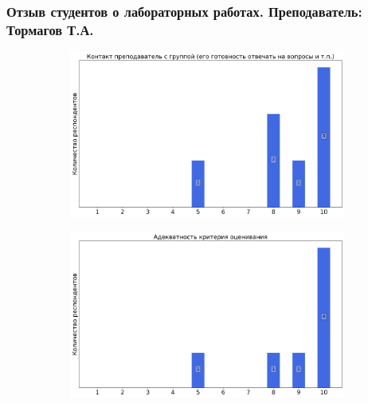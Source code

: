     \subsubsection{Отзыв студентов о лабораторных работах. Преподаватель: Тормагов Т.А.}
		\begin{figure}[H]
			\centering
			\begin{subfigure}[b]{0.45\textwidth}
				\centering
				\includegraphics[width=\textwidth]{images/3 course/Радиофизическая лаборатория/labniks-marks-Тормагов Т.А.-0.png}
			\end{subfigure}
			\begin{subfigure}[b]{0.45\textwidth}
				\centering
				\includegraphics[width=\textwidth]{images/3 course/Радиофизическая лаборатория/labniks-marks-Тормагов Т.А.-1.png}
			\end{subfigure}
			\begin{subfigure}[b]{0.45\textwidth}
				\centering

\end{subfigure}
\end{figure}
